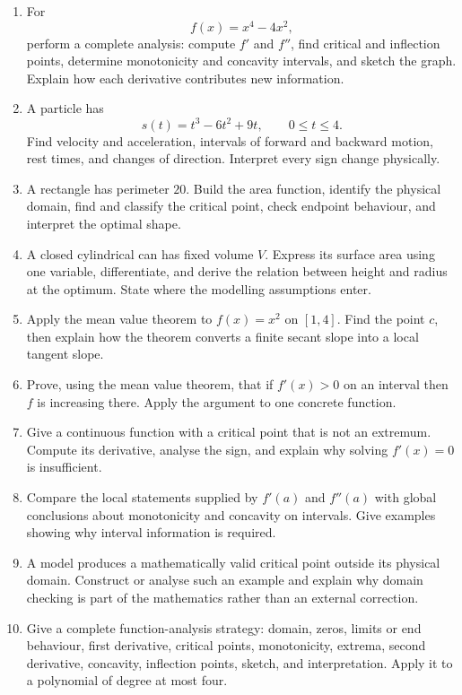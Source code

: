 \begin{enumerate}
\item For
\[
f(x)=x^4-4x^2,
\]
perform a complete analysis: compute $f'$ and $f''$, find critical and inflection points, determine monotonicity and concavity intervals, and sketch the graph. Explain how each derivative contributes new information.

\item A particle has
\[
s(t)=t^3-6t^2+9t,
\qquad0\le t\le4.
\]
Find velocity and acceleration, intervals of forward and backward motion, rest times, and changes of direction. Interpret every sign change physically.

\item A rectangle has perimeter $20$. Build the area function, identify the physical domain, find and classify the critical point, check endpoint behaviour, and interpret the optimal shape.

\item A closed cylindrical can has fixed volume $V$. Express its surface area using one variable, differentiate, and derive the relation between height and radius at the optimum. State where the modelling assumptions enter.

\item Apply the mean value theorem to $f(x)=x^2$ on $[1,4]$. Find the point $c$, then explain how the theorem converts a finite secant slope into a local tangent slope.

\item Prove, using the mean value theorem, that if $f'(x)>0$ on an interval then $f$ is increasing there. Apply the argument to one concrete function.

\item Give a continuous function with a critical point that is not an extremum. Compute its derivative, analyse the sign, and explain why solving $f'(x)=0$ is insufficient.

\item Compare the local statements supplied by $f'(a)$ and $f''(a)$ with global conclusions about monotonicity and concavity on intervals. Give examples showing why interval information is required.

\item A model produces a mathematically valid critical point outside its physical domain. Construct or analyse such an example and explain why domain checking is part of the mathematics rather than an external correction.

\item Give a complete function-analysis strategy: domain, zeros, limits or end behaviour, first derivative, critical points, monotonicity, extrema, second derivative, concavity, inflection points, sketch, and interpretation. Apply it to a polynomial of degree at most four.
\end{enumerate}
